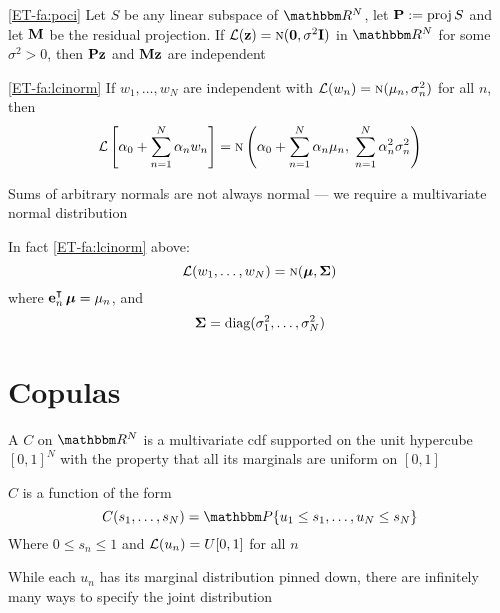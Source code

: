 \begin{frame}

    \vspace{2em}
    \Fact\eqref{ET-fa:poci}
    Let $S$ be any linear subspace of $\RR^N$, let $\mathbf P := \operatorname{proj} S$ and let
    $\mathbf M$ be the residual projection.  If $\mathcal L({\mathbf z}) = \textrm{\sc n}({\mathbf 0},
    \sigma^2 \mathbf I)$ in $\RR^N$ for some $\sigma^2 > 0$, then $\mathbf P {\mathbf z}$ and
    $\mathbf M {\mathbf z}$ are independent
    
    \vspace{1em}
    \Fact\eqref{ET-fa:lcinorm}
        If $w_1, \ldots, w_N$ are independent with $\mathcal L(w_n) = \textrm{\sc n}(\mu_n,
        \sigma_n^2)$ for all $n$, then
        \begin{equation*}
            \mathcal L \left[ \alpha_0 + \sum_{n=1}^N \alpha_n w_n \right]
            = \textrm{\sc n} \left( 
                \alpha_0 + \sum_{n=1}^N \alpha_n \mu_n,\;
                \sum_{n=1}^N \alpha_n^2 \sigma_n^2
                \right)
        \end{equation*}
\end{frame}

\begin{frame}

    \vspace{1em}
    Sums of arbitrary normals are not always normal --- we require a multivariate
    normal distribution
    
    \vspace{1em}
    In fact \eqref{ET-fa:lcinorm} above:
    $$\mathcal L(w_1, \ldots, w_N) = \textrm{\sc n}({\boldsymbol \mu},
    {\boldsymbol \Sigma})$$ 
    where $\bolde_n^\T \, \boldmu = \mu_n$, and
    $${\boldsymbol \Sigma} =
    \operatorname{diag}(\sigma_1^2, \ldots, \sigma_N^2)$$
 
    
\end{frame}

\section{Copulas}

\begin{frame}

    \vspace{2em}
    A  $C$ on $\RR^N$ is a multivariate {\sc cdf} supported
    on the unit hypercube $[0, 1]^N$ with the
    property that all its marginals are uniform on $[0, 1]$
    
    $C$ is a function of the form
    \begin{equation}
        \label{eq:icif}
        C(s_1, \ldots, s_N) = \PP \{u_1 \leq s_1, \ldots, u_N \leq s_N\}
    \end{equation}
    Where $0 \leq s_n \leq 1$ and $\mathcal L(u_n) = U[0, 1]$ for all $n$
    
    \vspace{1em}
    While each $u_n$ has its marginal
    distribution pinned down, there are infinitely many ways to specify the joint distribution
        
\end{frame}

